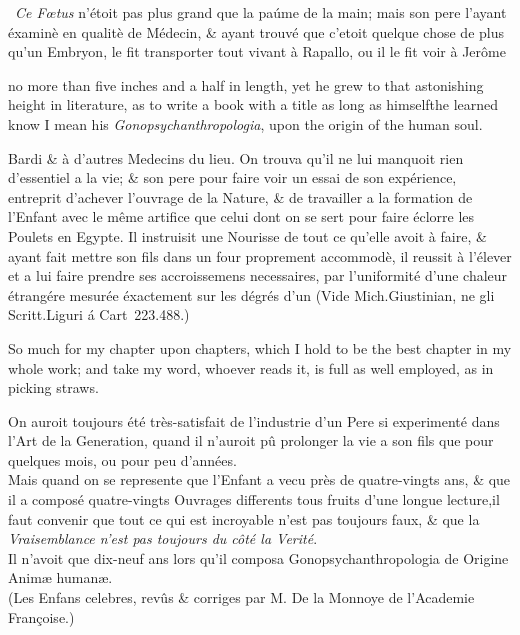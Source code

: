 \documentclass{article}
\begin{document}
\bgroup\footnotesize
\indent\fnast\ \textit{Ce Fœtus} n’étoit pas plus
grand que la paúme de la main; mais son pere l’ayant éxaminè
en qua\-litè de Médecin, \& ayant trouvé que c’etoit quelque
chose de plus qu’un Embryon, le fit transporter tout vivant
à Rapallo, ou il le fit voir à Jerôme\break
{}\par\egroup

\newpage\noindent
no more than five inches and a half in length, yet he grew
to that astonishing height in literature, as to write a book
with a title as long as himself\tsk the learned know I mean
his \textit{Gono\-psych\-an\-thropo\-logia}, upon the origin
of the human soul.\hfill\break{}


\vfill
\bgroup\footnotesize
\noindent
Bardi \& à d’autres Medecins du lieu.  On trouva
qu’il ne lui manquoit rien d’essentiel a la vie; \&
son pere pour faire voir un essai de son expérience, 
entreprit d’achever l’ouvrage de la Nature, \& de 
travailler a la formation de l’Enfant avec le même 
artifice que celui dont on se sert pour faire éclorre
les Poulets en Egypte. Il instruisit une Nourisse 
de tout ce qu’elle avoit à faire, \& ayant fait mettre
son fils dans un four proprement accommodè, il
reussit à l’élever et a lui faire prendre ses accroissemens 
necessaires, par l’uniformité d’une chaleur 
étrangére mesurée éxactement sur les dégrés d’un 
(Vide Mich.\@  Giustinian, ne gli Scritt.\@ Liguri á\break
Cart~223.\@ 488.)\hfill\break{}\par\egroup
\newpage
So much for my chapter upon chapters, which I hold
to be the best chapter in my whole work; and take my word, whoever
reads it, is full as well employed, as in picking straws.

\vfill


\vfill

\bgroup\footnotesize
On auroit toujours été très-satisfait de l’industrie
d’un Pere si experimenté dans l’Art de la Generation,
quand il n’auroit pû prolonger la vie a son
fils que pour quelques mois, ou pour peu d’années.\\
\indent
Mais quand on se represente que l’Enfant a vecu
près de quatre-vingts ans, \& que il a composé 
quatre-vingts Ouvrages differents tous fruits d’une 
longue lecture,\tsk il faut convenir que tout ce qui
est incroyable n’est pas toujours faux, \& que la 
\textit{Vraisemblance n’est pas toujours du côté la Verité}.\\
\indent
Il n’avoit que dix-neuf ans lors qu’il composa
Gonopsychanthropologia de Origine Animæ humanæ.\\
\indent
(Les Enfans celebres, revûs \& corriges par M. De la Monnoye de
l’Academie Françoise.)\par\egroup
\end{document}
